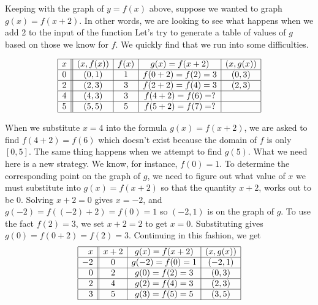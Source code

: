 \smallskip

Keeping with the graph of $y=f(x)$ above, suppose we wanted to graph $g(x) = f(x+2)$.  In other words, we are looking to see what happens when we add $2$ to the input of the function  Let's try to generate a table of values of $g$ based on those we know for $f$.  We quickly find that we run into some difficulties.


\[ \begin{array}{|c||c|c|c|c|}  

\hline

x & (x,f(x)) & f(x)& g(x)=f(x+2) & (x, g(x)) \\ \hline
0  & (0,1)& 1 & f(0+2) = f(2) = 3   &(0, 3) \\  \hline
2 & (2,3) & 3 & f(2+2) = f(4) = 3  &(2,3) \\  \hline
4 & (4,3) & 3 &  f(4+2) = f(6) = ? &  \\  \hline
5 & (5,5) & 5 & f(5+2) = f(7) = ?  &  \\  \hline

\end{array} \] 

When we substitute $x=4$ into the formula $g(x)=f(x+2)$, we are asked to find $f(4+2)=f(6)$ which doesn't exist because the domain of $f$ is only $[0,5]$.  The same thing happens when we attempt to find $g(5)$.  What we need here is a new strategy.  We know, for instance, $f(0) = 1$.  To determine the corresponding point on the graph of $g$, we need to figure out what value of $x$ we must substitute into $g(x) = f(x+2)$ so that the quantity $x+2$, works out to be $0$.  Solving $x+2=0$ gives $x=-2$, and $g(-2) = f((-2)+2) = f(0) = 1$ so  $(-2,1)$ is on the graph of $g$.  To use the fact $f(2) = 3$, we set $x+2 = 2$ to get $x=0$. Substituting gives $g(0) = f(0+2) = f(2) = 3$.  Continuing in this fashion, we get  \[ \begin{array}{|r||c|c|c|}  

\hline

x & x+2 & g(x)=f(x+2) & (x, g(x)) \\ \hline
-2 & 0 & g(-2)=f(0) = 1   &(-2, 1) \\  \hline
0 &  2 &  g(0)=f(2) = 3  &(0,3) \\  \hline
2 & 4  & g(2)=f(4) = 3 &  (2,3)\\  \hline
3 & 5 & g(3)=f(5) = 5  & (3,5) \\  \hline

\end{array} \] 

